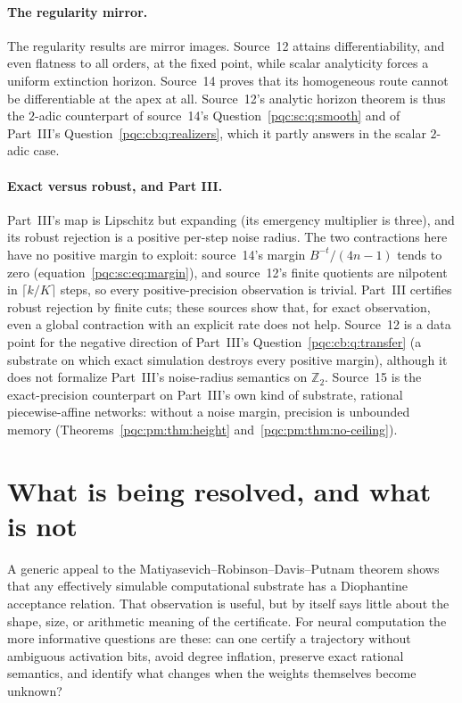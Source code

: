\documentclass[11pt,letterpaper]{article}
\numberwithin{equation}{section}
\theoremstyle{definition}
\theoremstyle{remark}
\newcommand{\srcmark}[1]{\par\noindent{\small\itshape [source~#1]}\par}
\newcommand{\Ztwo}{\mathbb Z_2}
\begin{document}
\paragraph{The regularity mirror.}
The regularity results are mirror images. Source~12 attains differentiability,
and even flatness to all orders, at the fixed point, while scalar analyticity
forces a uniform extinction horizon. Source~14 proves that its homogeneous route
cannot be differentiable at the apex at all. Source~12's analytic horizon
theorem is thus the $2$-adic counterpart of source~14's
Question~\ref{pqc:sc:q:smooth} and of Part~III's
Question~\ref{pqc:cb:q:realizers}, which it partly answers in the scalar
$2$-adic case.

\paragraph{Exact versus robust, and Part III.}
Part~III's map is Lipschitz but expanding (its emergency multiplier is three),
and its robust rejection is a positive per-step noise radius. The two contractions
here have no positive margin to exploit: source~14's margin $B^{-t}/(4n-1)$ tends
to zero (equation~\eqref{pqc:sc:eq:margin}), and source~12's finite quotients are
nilpotent in $\lceil k/K\rceil$ steps, so every positive-precision observation is
trivial. Part~III certifies robust rejection by finite cuts; these sources show
that, for exact observation, even a global contraction with an explicit rate does
not help. Source~12 is a data point for the negative direction of Part~III's
Question~\ref{pqc:cb:q:transfer} (a substrate on which exact simulation destroys
every positive margin), although it does not formalize Part~III's noise-radius
semantics on $\Ztwo$. Source~15 is the exact-precision counterpart on Part~III's
own kind of substrate, rational piecewise-affine networks: without a noise
margin, precision is unbounded memory
(Theorems~\ref{pqc:pm:thm:height} and~\ref{pqc:pm:thm:no-ceiling}).

\section{What is being resolved, and what is not}
\label{pqc:pm:sec:scope}
\srcmark{15}

A generic appeal to the Matiyasevich--Robinson--Davis--Putnam theorem shows that
any effectively simulable computational substrate has a Diophantine acceptance
relation. That observation is useful, but by itself says little about the shape,
size, or arithmetic meaning of the certificate. For neural computation the more
informative questions are these: can one certify a trajectory without ambiguous
activation bits, avoid degree inflation, preserve exact rational semantics,
and identify what changes when the weights themselves become unknown?
\end{document}
